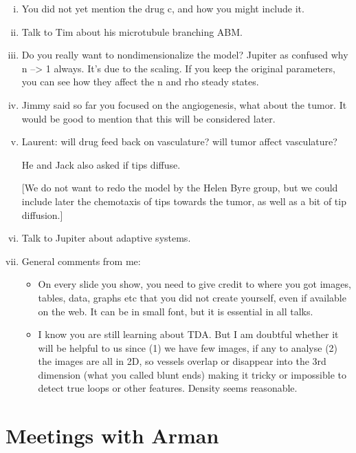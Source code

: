 \begin{itemize}
\begin{enumerate}[(i)]
	\item You did not yet mention the drug c, and how you might include it.
	
	\item Talk to Tim about his microtubule branching ABM.
	
	\item Do you really want to nondimensionalize the model? Jupiter as confused why n --> 1 always. It's due to the scaling. If you keep the original parameters, you can see how they affect the n and rho steady states.
	
	\item Jimmy said so far you focused on the angiogenesis, what about the tumor. It would be good to mention that this will be considered later.
	
	\item Laurent: will drug feed back on vasculature? will tumor affect vasculature?
	
	He and Jack also asked if tips diffuse.
	
	[We do not want to redo the model by the Helen Byre group, but we could include later the chemotaxis of tips towards the tumor, as well as a bit of tip diffusion.]
	
	\item Talk to Jupiter about adaptive systems.
	
	
	\item General comments from me:
	\begin{itemize}
	
	\item On every slide you show, you need to give credit to where you got images, tables, data, graphs etc that you did not create yourself, even if available on the web. It can be in small font, but it is essential in all talks.
	
	\item I know you are still learning about TDA. But I am doubtful whether it will be helpful to us since (1) we have few images, if any to analyse (2) the images are all in 2D, so vessels overlap or disappear into the 3rd dimension (what you called blunt ends) making it tricky or impossible to detect true loops or other features. Density seems reasonable.
	\end{itemize}
\end{enumerate}
\end{itemize}

\section{Meetings with Arman}